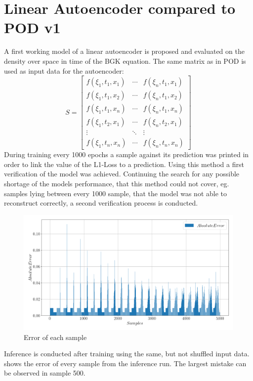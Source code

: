 \documentclass[12pt, a4paper]{article}
\begin{document}
\section{Linear Autoencoder compared to POD v1}
A first working model of a linear autoencoder is proposed and evaluated on the density over space in time of the BGK equation. The same matrix as in POD is used as input data for the autoencoder:
		\[S = \begin{bmatrix}
	f(\xi_1,t_1,x_1)&\cdots &f(\xi_n,t_1,x_1) \\
	f(\xi_1,t_1,x_2)&\cdots &f(\xi_n,t_1,x_2) \\
	f(\xi_1,t_1,x_n)&\cdots &f(\xi_n,t_1,x_n)\\
	f(\xi_1,t_2,x_1)&\cdots &f(\xi_n,t_2,x_1)\\
	\vdots & \ddots & \vdots\\
	f(\xi_1,t_n,x_n)&\cdots &f(\xi_n,t_n,x_n)
	\end{bmatrix}\]
During training every 1000 epochs a sample against its prediction was printed in order to link the value of the L1-Loss to a prediction. Using this method a first verification of the model was achieved. Continuing the search for any possible shortage of the models performance, that this method could not cover, eg. samples lying between every 1000 sample, that the model was not able to reconstruct correctly, a second verification process is conducted. 
\begin{figure}[htb!]
	\centering
	\includegraphics[width=.8\textwidth]{Error_samples_v1_1.png}
	\caption{Error of each sample}
	\label{Fig:error_sample}
\end{figure}
Inference is conducted after training using the same, but not shuffled input data.  shows the error of every sample from the inference run. The largest mistake can be observed in sample 500. 
\end{document}
